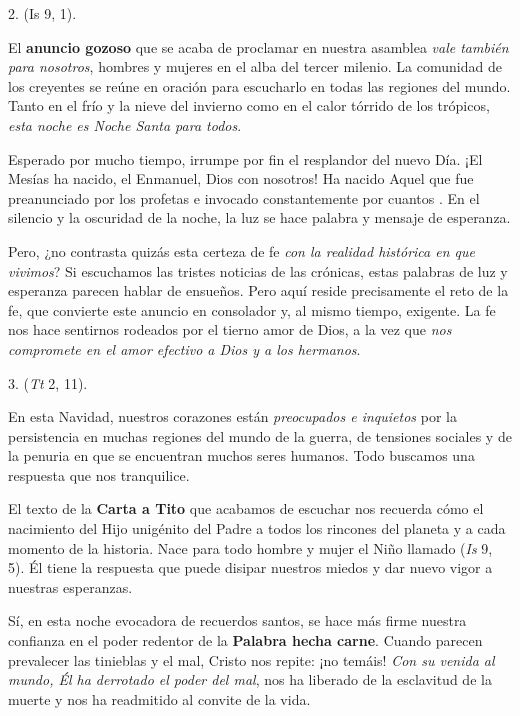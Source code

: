 2.  (Is 9, 1).

El \textbf{anuncio gozoso} que se acaba de proclamar en nuestra asamblea \emph{vale también para nosotros}, hombres y mujeres en el alba del tercer milenio. La comunidad de los creyentes se reúne en oración para escucharlo en todas las regiones del mundo. Tanto en el frío y la nieve del invierno como en el calor tórrido de los trópicos, \emph{esta noche es Noche Santa para todos}.

Esperado por mucho tiempo, irrumpe por fin el resplandor del nuevo Día. ¡El Mesías ha nacido, el Enmanuel, Dios con nosotros! Ha nacido Aquel que fue preanunciado por los profetas e invocado constantemente por cuantos . En el silencio y la oscuridad de la noche, la luz se hace palabra y mensaje de esperanza.

Pero, ¿no contrasta quizás esta certeza de fe \emph{con la realidad histórica en que vivimos}? Si escuchamos las tristes noticias de las crónicas, estas palabras de luz y esperanza parecen hablar de ensueños. Pero aquí reside precisamente el reto de la fe, que convierte este anuncio en consolador y, al mismo tiempo, exigente. La fe nos hace sentirnos rodeados por el tierno amor de Dios, a la vez que \emph{nos compromete en el amor efectivo a Dios y a los hermanos}.

3. \emph{} (\emph{Tt} 2, 11).

En esta Navidad, nuestros corazones están \emph{preocupados e inquietos} por la persistencia en muchas regiones del mundo de la guerra, de tensiones sociales y de la penuria en que se encuentran muchos seres humanos. Todo buscamos una respuesta que nos tranquilice.

El texto de la \textbf{Carta a Tito} que acabamos de escuchar nos recuerda cómo el nacimiento del Hijo unigénito del Padre \emph{} a todos los rincones del planeta y a cada momento de la historia. Nace para todo hombre y mujer el Niño llamado \emph{} (\emph{Is} 9, 5). Él tiene la respuesta que puede disipar nuestros miedos y dar nuevo vigor a nuestras esperanzas.

Sí, en esta noche evocadora de recuerdos santos, se hace más firme nuestra confianza en el poder redentor de la \textbf{Palabra hecha carne}. Cuando parecen prevalecer las tinieblas y el mal, Cristo nos repite: ¡no temáis! \emph{Con su venida al mundo, Él ha derrotado el poder del mal}, nos ha liberado de la esclavitud de la muerte y nos ha readmitido al convite de la vida.


